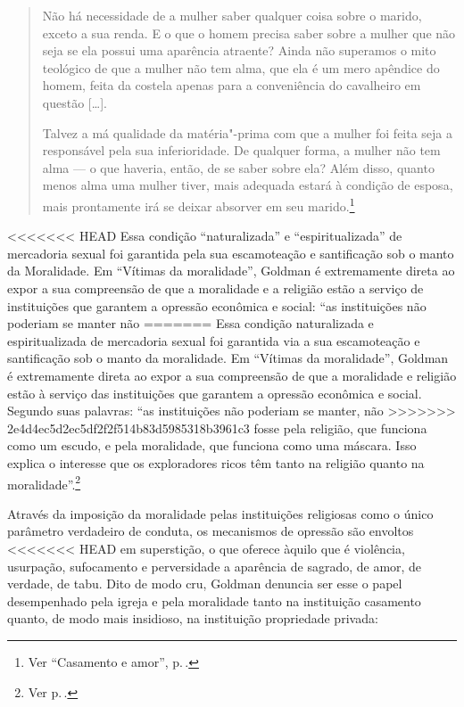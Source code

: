 \begin{quote}
Não há necessidade de a mulher saber
qualquer coisa sobre o marido, exceto a sua renda. E o que o homem
precisa saber sobre a mulher que não seja se ela possui uma aparência
atraente? Ainda não superamos o mito teológico de que a mulher não tem
alma, que ela é um mero apêndice do homem, feita da costela apenas para
a conveniência do cavalheiro em questão {[}\ldots{]}.

Talvez a má qualidade da matéria"-prima com que a mulher foi feita seja a
responsável pela sua inferioridade. De qualquer forma, a mulher não tem
alma --- o que haveria, então, de se saber sobre ela? Além disso, quanto
menos alma uma mulher tiver, mais adequada estará à condição de esposa,
mais prontamente irá se deixar absorver em seu marido.\footnote{Ver ``Casamento e amor'', p.\,\pageref{ref7}.}
\end{quote}

<<<<<<< HEAD
Essa condição ``naturalizada'' e ``espiritualizada'' de mercadoria
sexual foi garantida pela sua escamoteação e santificação sob o manto
da Moralidade. Em ``Vítimas da moralidade'', Goldman é extremamente
direta ao expor a sua compreensão de que a moralidade e a religião estão a
serviço de instituições que garantem a opressão econômica e social:
``as instituições não poderiam se manter não
=======
Essa condição naturalizada e espiritualizada de mercadoria
sexual foi garantida via a sua escamoteação e santificação sob o manto
da moralidade. Em ``Vítimas da moralidade'', Goldman é extremamente
direta ao expor a sua compreensão de que a moralidade e religião estão à
serviço das instituições que garantem a opressão econômica e social.
Segundo suas palavras: ``as instituições não poderiam se manter, não
>>>>>>> 2e4d4ec5d2ec5df2f2f514b83d5985318b3961c3
fosse pela religião, que funciona como um escudo, e pela moralidade, que
funciona como uma máscara. Isso explica o interesse que os exploradores
ricos têm tanto na religião quanto na moralidade''.\footnote{Ver p.\,\pageref{ref8}.} 

Através da
imposição da moralidade pelas instituições religiosas como o único
parâmetro verdadeiro de conduta, os mecanismos de opressão são envoltos
<<<<<<< HEAD
em superstição, o que oferece àquilo que é violência,
usurpação, sufocamento e perversidade a aparência de sagrado, de amor, de
verdade, de tabu. Dito de modo cru, Goldman denuncia ser esse o papel
desempenhado pela igreja e pela moralidade tanto na
instituição casamento quanto, de modo mais insidioso, na
instituição propriedade privada:

